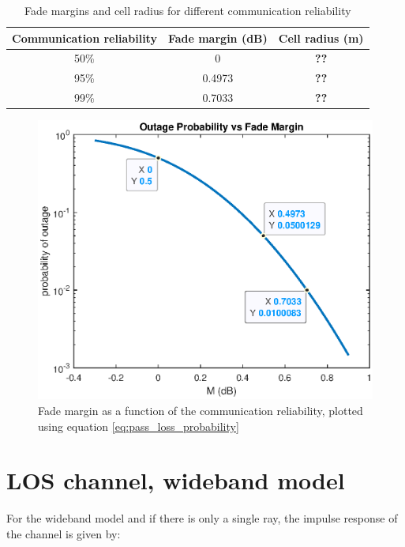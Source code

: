 \documentclass[10pt,a4paper]{ULBreport}
\begin{document}
\begin{table}[H]
    \centering
    \begin{tabular}{|c|c|c|}
        \hline
        Communication reliability & Fade margin (dB) & Cell radius (m) \\ \hline
        50\% & 0 & \textbf{??}\\ \hline
        95\% & 0.4973 & \textbf{??}\\ \hline
        99\% & 0.7033 & \textbf{??}\\ \hline
    \end{tabular}
    \caption{Fade margins and cell radius for different communication reliability}
    \label{tab:fade_margins}
\end{table}

\begin{figure}[H]
    \centering
    \includegraphics[width=1\textwidth]{3_7.eps}
    \caption{Fade margin as a function of the communication reliability, plotted using equation \ref{eq:pass_loss_probability}}
    \label{fig:fade_margin}
\end{figure}

\section{LOS channel, wideband model}
\label{sec:LOS_channel_wideband}

For the wideband model and if there is only a single ray, the impulse response of the channel is given by:
\end{document}
